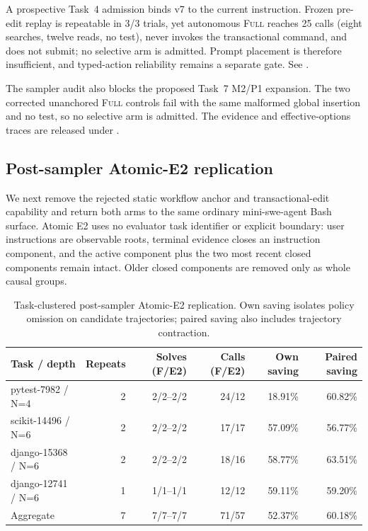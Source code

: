 \documentclass[11pt]{article}
\begin{document}
A prospective Task~4 admission binds v7 to the current instruction.  Frozen
pre-edit replay is repeatable in 3/3 trials, yet autonomous \textsc{Full} reaches
25 calls (eight searches, twelve reads, no test), never invokes the transactional
command, and does not submit; no selective arm is admitted.  Prompt placement
is therefore insufficient, and typed-action reliability remains a separate
gate.  See .

The sampler audit also blocks the proposed Task~7 M2/P1 expansion.  The two
corrected unanchored \textsc{Full} controls fail with the same malformed global
insertion and no test, so no selective arm is admitted.  The evidence and
effective-options traces are released under
.

\subsection{Post-sampler Atomic-E2 replication}

We next remove the rejected static workflow anchor and transactional-edit
capability and return both arms to the same ordinary mini-swe-agent Bash
surface.  Atomic E2 uses no evaluator task identifier or explicit boundary:
user instructions are observable roots, terminal evidence closes an
instruction component, and the active component plus the two most recent
closed components remain intact.  Older closed components are removed only as
whole causal groups.

\begin{table}[H]
\centering
\small
\caption{Task-clustered post-sampler Atomic-E2 replication.  Own saving
isolates policy omission on candidate trajectories; paired saving also
includes trajectory contraction.}
\label{tab:atomic-e2-post-sampler}
\begin{tabular}{lrrrrr}
\toprule
Task / depth & Repeats & Solves (F/E2) & Calls (F/E2) & Own saving & Paired saving \\
\midrule
pytest-7982 / N=4 & 2 & 2/2--2/2 & 24/12 & 18.91\% & 60.82\% \\
scikit-14496 / N=6 & 2 & 2/2--2/2 & 17/17 & 57.09\% & 56.77\% \\
django-15368 / N=6 & 2 & 2/2--2/2 & 18/16 & 58.77\% & 63.51\% \\
django-12741 / N=6 & 1 & 1/1--1/1 & 12/12 & 59.11\% & 59.20\% \\
Aggregate & 7 & 7/7--7/7 & 71/57 & 52.37\% & 60.18\% \\
\bottomrule
\end{tabular}
\end{table}
\end{document}

